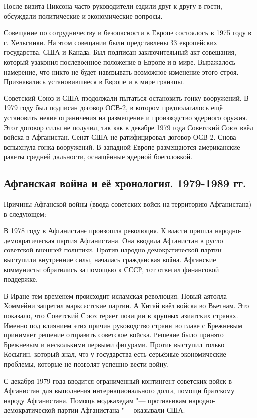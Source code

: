 \documentclass{article}
\begin{document}
После визита Никсона часто руководители ездили друг к другу в гости, обсуждали политические и экономические вопросы.

Совещание по сотрудничеству и безопасности в Европе состоялось в 1975 году в г. Хельсинки. На этом совещании были представлены 33 европейских государства, США и Канада. Был подписан заключительный акт совещания, который узаконил послевоенное положение в Европе и в мире. Выражалось намерение, что никто не будет навязывать возможное изменение этого строя. Признавались установившиеся в Европе и в мире границы.

Советский Союз и США продолжали пытаться остановить гонку вооружений. В 1979 году был подписан договор ОСВ-2, в котором предполагалось ещё установить некие ограничения на размещение и производство ядерного оружия. Этот договор силы не получил, так как в декабре 1979 года Советский Союз ввёл войска в Афганистан. Сенат США не ратифицировал договор ОСВ-2. Снова вспыхнула гонка вооружений. В западной Европе размещаются американские ракеты средней дальности, оснащённые ядерной боеголовкой.

\subsection{Афганская война и её хронология. 1979-1989 гг.}
Причины Афганской войны (ввода советских войск на территорию Афганистана) в следующем:

В 1978 году в Афганистане произошла революция. К власти пришла народно-демократическая партия Афганистана. Она вводила Афганистан в русло советской внешней политики. Против народно-демократической партии выступили внутренние силы, началась гражданская война. Афганские коммунисты обратились за помощью к СССР, тот ответил финансовой поддержке.

В Иране тем временем происходит исламская революция. Новый аятолла Хоммейни запретил марксистские партии. А Китай ввёл войска во Вьетнам. Это показало, что Советский Союз теряет позиции в крупных азиатских странах. Именно под влиянием этих причин руководство страны во главе с Брежневым принимает решение отправить советское войска. Решение было принято Брежневым и несколькими первыми фигурами. Против выступил только Косыгин, который знал, что у государства есть серьёзные экономические проблемы, которые не позволят успешно вести войну.

С декабря 1979 года вводится ограниченный контингент советских войск в Афганистан для выполнения интернационального долга, помощи братскому народу Афганистана. Помощь моджахедам "--- противникам народно-демократической партии Афганистана "--- оказывали США.
\end{document}
